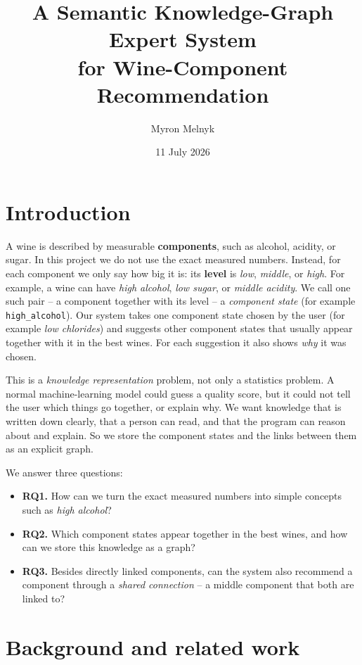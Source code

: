 \documentclass[12pt,a4paper]{article}
\title{A Semantic Knowledge-Graph Expert System \\ for Wine-Component Recommendation}
\author{Myron Melnyk}
\date{11 July 2026}
\begin{document}
	\maketitle

	\section*{Introduction}
	A wine is described by measurable \textbf{components}, such as alcohol, acidity,
	or sugar. In this project we do not use the exact measured numbers. Instead, for
	each component we only say how big it is: its \textbf{level} is \emph{low},
	\emph{middle}, or \emph{high}. For example, a wine can have \emph{high alcohol},
	\emph{low sugar}, or \emph{middle acidity}. We call one such pair -- a component
	together with its level -- a \emph{component state} (for example
	\texttt{high\_alcohol}). Our system takes one component state chosen by the user
	(for example \emph{low chlorides}) and suggests other component states that
	usually appear together with it in the best wines. For each suggestion it also
	shows \emph{why} it was chosen.

	This is a \emph{knowledge representation} problem, not only a statistics problem.
	A normal machine-learning model could guess a quality score, but it could not
	tell the user which things go together, or explain why. We want knowledge that is
	written down clearly, that a person can read, and that the program can reason
	about and explain. So we store the component states and the links between them as
	an explicit graph.

	We answer three questions:
	\begin{itemize}
		\item \textbf{RQ1.} How can we turn the exact measured numbers into simple
		concepts such as \emph{high alcohol}?
		\item \textbf{RQ2.} Which component states appear together in the best wines,
		and how can we store this knowledge as a graph?
		\item \textbf{RQ3.} Besides directly linked components, can the system also
		recommend a component through a \emph{shared connection} -- a middle
		component that both are linked to?
	\end{itemize}

	\section*{Background and related work}
\end{document}
